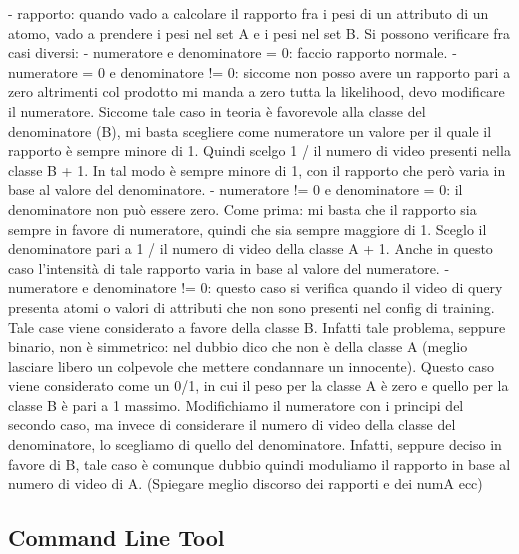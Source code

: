 - rapporto: quando vado a calcolare il rapporto fra i pesi di un attributo di un atomo, vado a prendere i pesi nel set A e i pesi nel set B. Si possono verificare fra casi diversi:
 - numeratore e denominatore = 0: faccio rapporto normale.
 - numeratore = 0 e denominatore != 0: siccome non posso avere un rapporto pari a zero altrimenti col prodotto mi manda a zero tutta la likelihood, devo modificare il numeratore. Siccome tale caso in teoria è favorevole alla classe del denominatore (B), mi basta scegliere come numeratore un valore per il quale il rapporto è sempre minore di 1. Quindi scelgo 1 / il numero di video presenti nella classe B + 1. In tal modo è sempre minore di 1, con il rapporto che però varia in base al valore del denominatore.
 - numeratore != 0 e denominatore = 0: il denominatore non può essere zero. Come prima: mi basta che il rapporto sia sempre in favore di numeratore, quindi che sia sempre maggiore di 1. Sceglo il denominatore pari a 1 / il numero di video della classe A + 1. Anche in questo caso l'intensità di tale rapporto varia in base al valore del numeratore.
 - numeratore e denominatore != 0: questo caso si verifica quando il video di query presenta atomi o valori di attributi che non sono presenti nel config di training. Tale case viene considerato a favore della classe B. Infatti tale problema, seppure binario, non è simmetrico: nel dubbio dico che non è della classe A (meglio lasciare libero un colpevole che mettere condannare un innocente). Questo caso viene considerato come un 0/1, in cui il peso per la classe A è zero e quello per la classe B è pari a 1 massimo. Modifichiamo il numeratore con i principi del secondo caso, ma invece di considerare il numero di video della classe del denominatore, lo scegliamo di quello del denominatore. Infatti, seppure deciso in favore di B, tale caso è comunque dubbio quindi moduliamo il rapporto in base al numero di video di A.
 (Spiegare meglio discorso dei rapporti e dei numA ecc)

\subsection{Command Line Tool}


